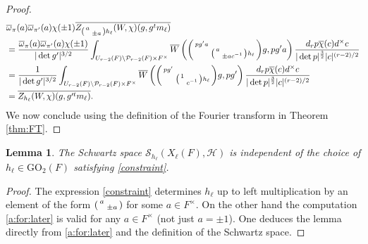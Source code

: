 \documentclass[12pt]{amsart}
\newtheorem{lem}[thm]{Lemma}
\theoremstyle{remark}
\numberwithin{equation}{section}
\theoremstyle{definition}
\newenvironment{psmatrix}
  {\left(\begin{smallmatrix}}
  {\end{smallmatrix}\right)}
\numberwithin{equation}{subsection}
\begin{document}
{\begin{proof}
\begin{align*}
    &\overline{\omega}_{\pi}(a)\overline{\omega}_{\pi'}(a)\chi(\pm 1)\overline{Z_{\begin{psmatrix}
        a & \\
          & \pm a    \end{psmatrix} h_\ell}(W,\chi)(g,g^tm_{\ell})}\\
    &=\frac{\overline{\omega}_{\pi}(a)\overline{\omega}_{\pi'}(a)\chi(\pm 1)}{|\det g'|^{3/2}}\int_{U_{r-2}(F) \backslash \mathcal{P}_{r-2}(F) \times F^\times} \overline{W}\left(\begin{psmatrix}pg'a & \\ &  \begin{psmatrix} a & \\ & \pm ac^{-1} \end{psmatrix}h_\ell\end{psmatrix}g,pg'a \right)\frac{d_r p\overline{\chi}(c)d^\times c}{|\det p|^{\frac{3}{2}}|c|^{(r-2)/2}}\\
    &=\frac{1}{|\det g'|^{3/2}}\int_{U_{r-2}(F) \backslash \mathcal{P}_{r-2}(F) \times F^\times} \overline{W}\left(\begin{psmatrix}pg' & \\ &  \begin{psmatrix}  1 & \\ & c^{-1} \end{psmatrix}h_\ell\end{psmatrix}g,pg' \right)\frac{d_r p\overline{\chi}(c)d^\times c}{|\det p|^{\frac{3}{2}}|c|^{(r-2)/2}}\\
    &= \overline{Z_{h_\ell}(W,\chi)(g,g'^tm_{\ell})}.
\end{align*}
We now conclude using the definition of the Fourier transform in Theorem \ref{thm:FT}.
\end{proof}




\begin{lem}The Schwartz space $\mathcal{S}_{h_\ell}(X_\ell(F),\mathcal{H})$ is independent of the choice of $h_\ell \in \mathrm{GO}_2(F)$ satisfying \eqref{constraint}.
\end{lem}

\begin{proof}
The expression \eqref{constraint} determines $h_\ell$ up to left multiplication by an element of the form $\begin{psmatrix} a & \\ & \pm a \end{psmatrix}$ for some $a \in F^\times.$  On the other hand the computation \eqref{a:for:later} is valid for any $a \in F^\times$ (not just $a =\pm 1$).  One deduces the lemma directly from \eqref{a:for:later} and the definition of the Schwartz space.
\end{proof}}
\end{document}
